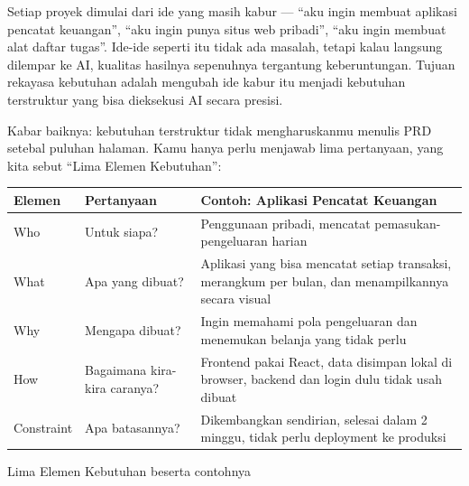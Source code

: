 


Setiap proyek dimulai dari ide yang masih kabur — “aku ingin membuat aplikasi pencatat keuangan”, “aku ingin punya situs web pribadi”, “aku ingin membuat alat daftar tugas”. Ide-ide seperti itu tidak ada masalah, tetapi kalau langsung dilempar ke AI, kualitas hasilnya sepenuhnya tergantung keberuntungan. Tujuan rekayasa kebutuhan adalah mengubah ide kabur itu menjadi kebutuhan terstruktur yang bisa dieksekusi AI secara presisi.

Kabar baiknya: kebutuhan terstruktur tidak mengharuskanmu menulis PRD setebal puluhan halaman. Kamu hanya perlu menjawab lima pertanyaan, yang kita sebut “Lima Elemen Kebutuhan”:

\begin{center}
\begin{tabularx}{\linewidth}{|X|X|X|}
\hline
\textbf{Elemen} & \textbf{Pertanyaan} & \textbf{Contoh: Aplikasi Pencatat Keuangan} \tabularnewline
\hline
Who & Untuk siapa? & Penggunaan pribadi, mencatat pemasukan-pengeluaran harian \tabularnewline
What & Apa yang dibuat? & Aplikasi yang bisa mencatat setiap transaksi, merangkum per bulan, dan menampilkannya secara visual \tabularnewline
Why & Mengapa dibuat? & Ingin memahami pola pengeluaran dan menemukan belanja yang tidak perlu \tabularnewline
How & Bagaimana kira-kira caranya? & Frontend pakai React, data disimpan lokal di browser, backend dan login dulu tidak usah dibuat \tabularnewline
Constraint & Apa batasannya? & Dikembangkan sendirian, selesai dalam 2 minggu, tidak perlu deployment ke produksi \tabularnewline
\hline
\end{tabularx}
\end{center}

\begin{center}\small\color{gray}Lima Elemen Kebutuhan beserta contohnya\end{center}

